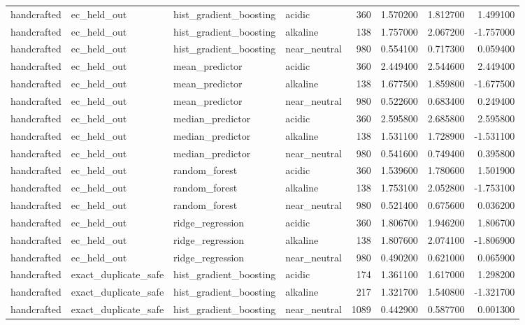 \begin{longtable}{llllrrrr}
handcrafted & ec\_held\_out & hist\_gradient\_boosting & acidic & 360 & 1.570200 & 1.812700 & 1.499100 \\
handcrafted & ec\_held\_out & hist\_gradient\_boosting & alkaline & 138 & 1.757000 & 2.067200 & -1.757000 \\
handcrafted & ec\_held\_out & hist\_gradient\_boosting & near\_neutral & 980 & 0.554100 & 0.717300 & 0.059400 \\
handcrafted & ec\_held\_out & mean\_predictor & acidic & 360 & 2.449400 & 2.544600 & 2.449400 \\
handcrafted & ec\_held\_out & mean\_predictor & alkaline & 138 & 1.677500 & 1.859800 & -1.677500 \\
handcrafted & ec\_held\_out & mean\_predictor & near\_neutral & 980 & 0.522600 & 0.683400 & 0.249400 \\
handcrafted & ec\_held\_out & median\_predictor & acidic & 360 & 2.595800 & 2.685800 & 2.595800 \\
handcrafted & ec\_held\_out & median\_predictor & alkaline & 138 & 1.531100 & 1.728900 & -1.531100 \\
handcrafted & ec\_held\_out & median\_predictor & near\_neutral & 980 & 0.541600 & 0.749400 & 0.395800 \\
handcrafted & ec\_held\_out & random\_forest & acidic & 360 & 1.539600 & 1.780600 & 1.501900 \\
handcrafted & ec\_held\_out & random\_forest & alkaline & 138 & 1.753100 & 2.052800 & -1.753100 \\
handcrafted & ec\_held\_out & random\_forest & near\_neutral & 980 & 0.521400 & 0.675600 & 0.036200 \\
handcrafted & ec\_held\_out & ridge\_regression & acidic & 360 & 1.806700 & 1.946200 & 1.806700 \\
handcrafted & ec\_held\_out & ridge\_regression & alkaline & 138 & 1.807600 & 2.074100 & -1.806900 \\
handcrafted & ec\_held\_out & ridge\_regression & near\_neutral & 980 & 0.490200 & 0.621000 & 0.065900 \\
handcrafted & exact\_duplicate\_safe & hist\_gradient\_boosting & acidic & 174 & 1.361100 & 1.617000 & 1.298200 \\
handcrafted & exact\_duplicate\_safe & hist\_gradient\_boosting & alkaline & 217 & 1.321700 & 1.540800 & -1.321700 \\
handcrafted & exact\_duplicate\_safe & hist\_gradient\_boosting & near\_neutral & 1089 & 0.442900 & 0.587700 & 0.001300 \\

\end{longtable}
